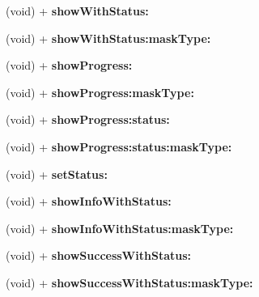 \begin{DoxyCompactItemize}
(void) + {\bfseries show\+With\+Status\+:}
\item 
\mbox{\label{interface_s_v_progress_h_u_d_a698e603ad6ce3cbfb647eaf171fe3401}} 
(void) + {\bfseries show\+With\+Status\+:mask\+Type\+:}
\item 
\mbox{\label{interface_s_v_progress_h_u_d_ac9563b162ed76b48df1762157d02c028}} 
(void) + {\bfseries show\+Progress\+:}
\item 
\mbox{\label{interface_s_v_progress_h_u_d_ab1d8666ead49c1c12c3db56a46946909}} 
(void) + {\bfseries show\+Progress\+:mask\+Type\+:}
\item 
\mbox{\label{interface_s_v_progress_h_u_d_a63e03edf6fa8dc21206be7f82fcb62b6}} 
(void) + {\bfseries show\+Progress\+:status\+:}
\item 
\mbox{\label{interface_s_v_progress_h_u_d_ae732a299150dc37ae469d33dcbeb13f3}} 
(void) + {\bfseries show\+Progress\+:status\+:mask\+Type\+:}
\item 
\mbox{\label{interface_s_v_progress_h_u_d_af8676af89efaaba13543aa9cb2b72a8a}} 
(void) + {\bfseries set\+Status\+:}
\item 
\mbox{\label{interface_s_v_progress_h_u_d_ad33521685958c52cab08b4ffeedb2a68}} 
(void) + {\bfseries show\+Info\+With\+Status\+:}
\item 
\mbox{\label{interface_s_v_progress_h_u_d_a97d5685d42e8bd9e6341e39e7f929348}} 
(void) + {\bfseries show\+Info\+With\+Status\+:mask\+Type\+:}
\item 
\mbox{\label{interface_s_v_progress_h_u_d_a869192f8fa7670e0e361cba5efbc4c9d}} 
(void) + {\bfseries show\+Success\+With\+Status\+:}
\item 
\mbox{\label{interface_s_v_progress_h_u_d_a2ee763f36bd41012f6c38a58aad92252}} 
(void) + {\bfseries show\+Success\+With\+Status\+:mask\+Type\+:}
\item 

\end{DoxyCompactItemize}
